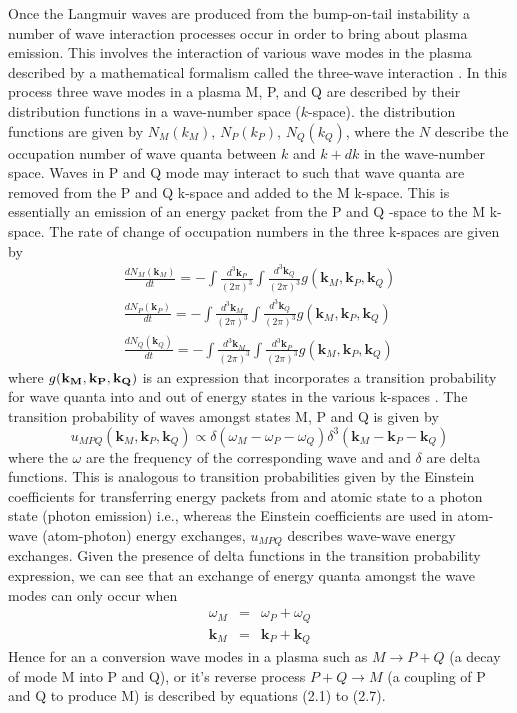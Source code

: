 Once the Langmuir waves are produced from the bump-on-tail instability a number of wave interaction processes occur in order to bring about plasma emission. This involves the interaction of various wave modes in the plasma described by a mathematical formalism called the three-wave interaction \citep{robinson1993, robinson1994}. In this process three wave modes in a plasma M, P, and Q are described by their distribution functions in a wave-number space ($k$-space). the distribution functions are given by $N_M(k_M)$, $N_P(k_P)$, $N_Q(k_Q)$, where the $N$ describe the occupation number of wave quanta between $k$ and $k+dk$ in the wave-number space. Waves in P and Q mode may interact to such that wave quanta are removed from the P and Q k-space and added to the M k-space. This is essentially an emission of an energy packet from the P and Q -space to the M k-space. The rate of change of occupation numbers in the three k-spaces are given by
\begin{eqnarray}
\frac{dN_M(\mathbf{k}_M)}{dt} = -\int \frac{d^3\mathbf{k}_P}{(2\pi)^3}\int \frac{d^3\mathbf{k}_Q}{(2\pi)^3}g(\mathbf{k}_M, \mathbf{k}_P, \mathbf{k}_Q) \\
%
\frac{dN_P(\mathbf{k}_P)}{dt} = -\int \frac{d^3\mathbf{k}_M}{(2\pi)^3}\int \frac{d^3\mathbf{k}_Q}{(2\pi)^3}g(\mathbf{k}_M, \mathbf{k}_P, \mathbf{k}_Q) \\
%
\frac{dN_Q(\mathbf{k}_Q)}{dt} = -\int \frac{d^3\mathbf{k}_M}{(2\pi)^3}\int \frac{d^3\mathbf{k}_P}{(2\pi)^3}g(\mathbf{k}_M, \mathbf{k}_P, \mathbf{k}_Q)
\end{eqnarray}
where $g(\bf{k}_M, \bf{k}_P, \bf{k}_Q)$ is an expression that incorporates a transition probability for wave quanta into and out of energy states in the various k-spaces \citep{robinson1994}. The transition probability of waves amongst states M, P and Q is given by \citep{melrose1986}
\begin{equation}
u_{MPQ}(\mathbf{k}_M, \mathbf{k}_P, \mathbf{k}_Q)  \propto \delta(\omega_M - \omega_P - \omega_Q ) \delta^3(\mathbf{k}_M - \mathbf{k}_P - \mathbf{k}_Q )
\end{equation}
where the $\omega$ are the frequency of the corresponding wave and and $\delta$ are delta functions. This is analogous to transition probabilities given by the Einstein coefficients for transferring energy packets from and atomic state to a photon state (photon emission) i.e., whereas the Einstein coefficients are used in atom-wave (atom-photon) energy exchanges, $u_{MPQ}$ describes wave-wave energy exchanges. Given the presence of delta functions in the transition probability expression, we can see that an exchange of energy quanta amongst the wave modes can only occur when 
\begin{eqnarray}
\omega_M & = & \omega_P + \omega_Q \\
\mathbf{k}_M & = & \mathbf{k}_P + \mathbf{k}_Q
\end{eqnarray}
Hence for an a conversion wave modes in a plasma such as $M \rightarrow P + Q$ (a decay of mode M into P and Q), or it's reverse process $P + Q \rightarrow M $ (a coupling of P and Q to produce M) is described by equations (2.1) to (2.7). 

